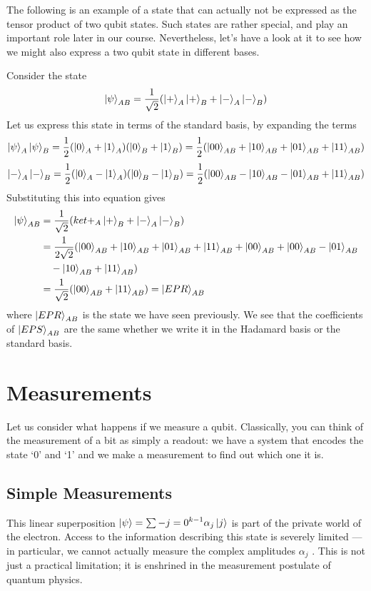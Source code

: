 The following is an example of a state that can actually not be expressed as the tensor product
of two qubit states. Such states are rather special, and play an important role later in our course.
Nevertheless, let’s have a look at it to see how we might also express a two qubit state in different
bases.
\begin{example}
    Consider the state
    \[
    \ket{\psi}_{AB}=\frac{1}{\sqrt{2}}(\ket{+}_A\ket{+}_B+\ket{-}_A\ket{-}_B)
    \]
    Let us express this state in terms of the standard basis, by expanding the terms
    \[
    \ket{\psi}_A\ket{\psi}_B=\frac{1}{2}(\ket{0}_A+\ket{1}_A)(\ket{0}_B+\ket{1}_B)=\frac{1}{2}(\ket{00}_{AB}+\ket{10}_{AB}+\ket{01}_{AB}+\ket{11}_{AB})
    \]
    \[
    \ket{-}_A\ket{-}_B=\frac{1}{2}(\ket{0}_A-\ket{1}_A)(\ket{0}_B-\ket{1}_B)=\frac{1}{2}(\ket{00}_{AB}-\ket{10}_{AB}-\ket{01}_{AB}+\ket{11}_{AB})
    \]
    Substituting this into equation gives
    \begin{align*}
    \ket{\psi}_{AB}&=\frac{1}{\sqrt{2}}(ket{+}_A\ket{+}_B+\ket{-}_A\ket{-}_B)\\
    &=\frac{1}{2\sqrt{2}}(\ket{00}_{AB}+\ket{10}_{AB}+\ket{01}_{AB}+\ket{11}_{AB}+\ket{00}_{AB}+\ket{00}_{AB}-\ket{01}_{AB}\\
    &\quad -\ket{10}_{AB}+\ket{11}_{AB})\\
    &=\frac{1}{\sqrt{2}}(\ket{00}_{AB}+\ket{11}_{AB})=\ket{EPR}_{AB}
    \end{align*}
    where $\ket{EPR}_{AB}$ is the state we have seen previously. We see that the coefficients of $\ket{EPS}_{AB}$ are the same whether we write it in the Hadamard basis or the standard basis.
\end{example}



\section{Measurements}
Let us consider what happens if we measure a qubit. Classically, you can think of the measurement
of a bit as simply a readout: we have a system that encodes the state ‘0’ and ‘1’ and we make a
measurement to find out which one it is.
\subsection{Simple Measurements}
This linear superposition $\ket{\psi}=\sum-{j=0}^{k-1}\alpha_j\ket{j}$ is part of the private world of the
electron. Access to the information describing this state is severely limited —
in particular, we cannot actually measure the complex amplitudes $\alpha_j$ . This is
not just a practical limitation; it is enshrined in the measurement postulate
of quantum physics.

